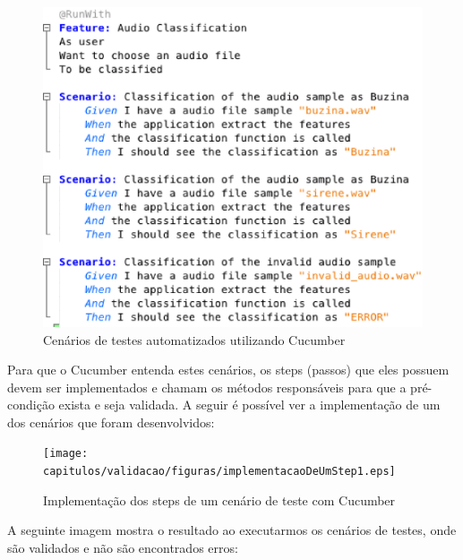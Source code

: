 \begin{figure}[H]
	\centering
	\captionsetup{justification=centering,margin=2cm}
	\includegraphics[scale=0.65]{capitulos/validacao/figuras/cenariosDoBDD.eps}
	\caption{Cenários de testes automatizados utilizando Cucumber}
	\label{fig:result-engajamento}
\end{figure}

Para que o Cucumber entenda estes cenários, os steps (passos) que eles possuem devem ser implementados e chamam os métodos responsáveis para que a pré-condição exista e seja validada. A seguir é possível ver a implementação de um dos cenários que foram desenvolvidos:


\begin{figure}[H]
	\centering
	\captionsetup{justification=centering,margin=2cm}
	\texttt{[image: capitulos/validacao/figuras/implementacaoDeUmStep1.eps]}
	\caption{Implementação dos steps de um cenário de teste com Cucumber}
	\label{fig:result-engajamento}
\end{figure}

A seguinte imagem mostra o resultado ao executarmos os cenários de testes, onde são validados e não são encontrados erros:

